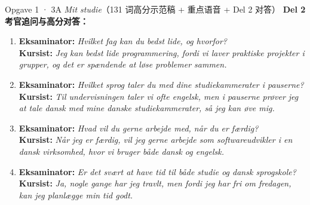 \begin{tipbox}{Opgave 1 · 3A \textit{Mit studie}（131 词高分示范稿 + 重点语音 + Del 2 对答）}
\vspace{0.3em}
\textbf{Del 2 考官追问与高分对答：}
\begin{enumerate}
  \item \textbf{Eksaminator:} \textit{Hvilket fag kan du bedst lide, og hvorfor?}\\
  \textbf{Kursist:} \textit{Jeg kan bedst lide programmering, fordi vi laver praktiske projekter i grupper, og det er spændende at løse problemer sammen.}
  \item \textbf{Eksaminator:} \textit{Hvilket sprog taler du med dine studiekammerater i pauserne?}\\
  \textbf{Kursist:} \textit{Til undervisningen taler vi ofte engelsk, men i pauserne prøver jeg at tale dansk med mine danske studiekammerater, så jeg kan øve mig.}
  \item \textbf{Eksaminator:} \textit{Hvad vil du gerne arbejde med, når du er færdig?}\\
  \textbf{Kursist:} \textit{Når jeg er færdig, vil jeg gerne arbejde som softwareudvikler i en dansk virksomhed, hvor vi bruger både dansk og engelsk.}
  \item \textbf{Eksaminator:} \textit{Er det svært at have tid til både studie og dansk sprogskole?}\\
  \textbf{Kursist:} \textit{Ja, nogle gange har jeg travlt, men fordi jeg har fri om fredagen, kan jeg planlægge min tid godt.}
\end{enumerate}
\end{tipbox}

